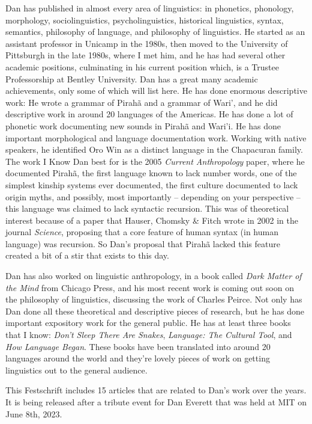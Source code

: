 \documentclass[output=paper,biblatex,babelshorthands,newtxmath,draftmode,colorlinks,citecolor=brown]{langscibook}
\begin{document}
Dan has published in almost every area of linguistics: in phonetics, phonology, morphology, sociolinguistics, psycholinguistics, historical linguistics, syntax, semantics, philosophy of language, and philosophy of linguistics. He started as an assistant professor in Unicamp in the 1980s, then moved to the University of Pittsburgh in the late 1980s, where I met him, and he has had several other academic positions, culminating in his current position which, is a Trustee Professorship at  Bentley University. Dan has a great many academic achievements, only some of which will list here. He has done enormous descriptive work: He wrote  a grammar of Pirahã and a grammar of Wari', and he did descriptive work in around 20 languages of the Americas. He has done a lot of phonetic work documenting new sounds in Pirahã and Wari'i. He has done important morphological and language documentation work. Working with native speakers, he identified Oro Win as a distinct language in the Chapacuran family. The work I Know Dan best for is the 2005 \textit{Current Anthropology} paper, where he documented Pirahã, the first language known to lack number words, one of the simplest kinship systems ever documented, the first culture documented to lack origin myths, and possibly, most importantly -- depending on your perspective -- this language was claimed to lack syntactic recursion. This was of theoretical interest because of a paper that Hauser, Chomsky \& Fitch wrote in 2002 in the journal \textit{Science}, proposing that a core feature of human syntax (in human language) was recursion. So Dan's proposal that Pirahã lacked this feature created a bit of a stir that exists to this day.

Dan has also worked on linguistic anthropology, in a book called \textit{Dark Matter of the Mind} from Chicago Press, and his most recent work is coming out soon on the philosophy of linguistics, discussing the work of Charles Peirce.  Not only has Dan done all these theoretical and descriptive pieces of research, but he has done important expository work for the general public. He has at least three books that I know: \textit{Don't Sleep There Are Snakes}, \textit{Language: The Cultural Tool}, and \textit{How Language Began}. These books have been translated into around 20 languages around the world and they're lovely pieces of work on getting linguistics out to the general audience. 

This Festschrift includes 15 articles that are related to Dan's work over the years. It is being released after a tribute event for Dan Everett that was held at MIT on June 8th, 2023. 
\end{document}
